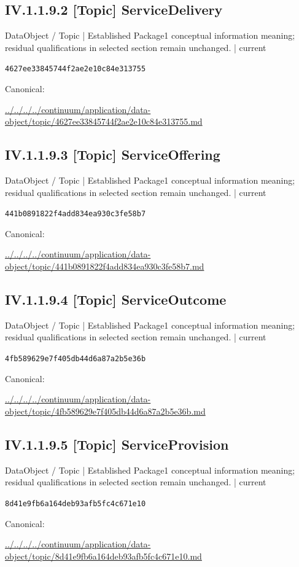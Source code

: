 \documentclass[10pt,a4paper]{article}
\begin{document}
\subsection*{IV.1.1.9.2 [Topic] ServiceDelivery}
\label{element-4627ee33845744f2ae2e10c84e313755}
{\small DataObject / Topic | Established Package1 conceptual information meaning; residual qualifications in selected section remain unchanged. | current}\par
\texttt{4627ee33845744f2ae2e10c84e313755}\par
Canonical: \par
{\footnotesize\url{../../../../continuum/application/data-object/topic/4627ee33845744f2ae2e10c84e313755.md}}\par
\subsection*{IV.1.1.9.3 [Topic] ServiceOffering}
\label{element-441b0891822f4add834ea930c3fe58b7}
{\small DataObject / Topic | Established Package1 conceptual information meaning; residual qualifications in selected section remain unchanged. | current}\par
\texttt{441b0891822f4add834ea930c3fe58b7}\par
Canonical: \par
{\footnotesize\url{../../../../continuum/application/data-object/topic/441b0891822f4add834ea930c3fe58b7.md}}\par
\subsection*{IV.1.1.9.4 [Topic] ServiceOutcome}
\label{element-4fb589629e7f405db44d6a87a2b5e36b}
{\small DataObject / Topic | Established Package1 conceptual information meaning; residual qualifications in selected section remain unchanged. | current}\par
\texttt{4fb589629e7f405db44d6a87a2b5e36b}\par
Canonical: \par
{\footnotesize\url{../../../../continuum/application/data-object/topic/4fb589629e7f405db44d6a87a2b5e36b.md}}\par
\subsection*{IV.1.1.9.5 [Topic] ServiceProvision}
\label{element-8d41e9fb6a164deb93afb5fc4c671e10}
{\small DataObject / Topic | Established Package1 conceptual information meaning; residual qualifications in selected section remain unchanged. | current}\par
\texttt{8d41e9fb6a164deb93afb5fc4c671e10}\par
Canonical: \par
{\footnotesize\url{../../../../continuum/application/data-object/topic/8d41e9fb6a164deb93afb5fc4c671e10.md}}\par
\end{document}
